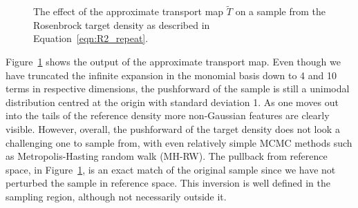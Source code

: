 \documentclass[final]{siamltex}
\begin{document}
\begin{figure}[htpb]
\centering
{}\quad
{}\quad
{}
\caption{The effect of the approximate transport map $\tilde{T}$ on a
  sample from the Rosenbrock target density as described in Equation~\eqref{eqn:R2_repeat}.}
\label{fig:R2_transport}
\end{figure}

Figure~\ref{fig:R2_transport} shows the output of the approximate
transport map. Even though we have truncated the infinite expansion in
the monomial basis down to 4 and 10 terms in respective dimensions,
the pushforward of the sample is still a unimodal distribution
centred at the origin with standard deviation 1. As one moves out into
the tails of the reference density more non-Gaussian features are
clearly visible. However, overall, the pushforward of the target
density does not look a challenging one to sample from, with even
relatively simple MCMC methods such as Metropolis-Hasting random walk (MH-RW). The pullback from
reference space, in Figure~\ref{fig:R2_transport}, is an exact match
of the original sample since we have not perturbed the sample in
reference space. This inversion is well defined in the sampling
region, although not necessarily outside it\cite{parno2018transport}.
\end{document}
